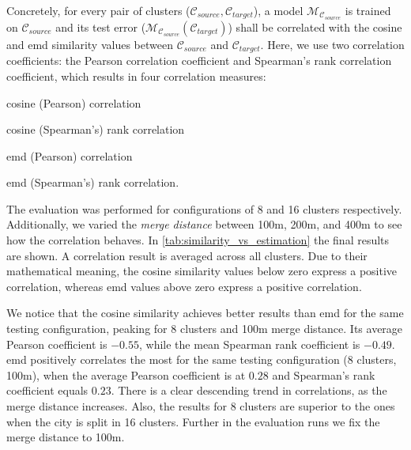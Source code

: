 	
	 
	Concretely, for every pair of clusters ($\mathcal{C}_{source}, \mathcal{C}_{target}$), a model $\mathcal{M}_{\mathcal{C}_{source}}$ is trained on $\mathcal{C}_{source}$ and its test error ($\mathcal{M}_{\mathcal{C}_{source}}(\mathcal{C}_{target})$) shall be correlated with the cosine and emd similarity values between $\mathcal{C}_{source}$ and $\mathcal{C}_{target}$. Here, we use two correlation coefficients: the Pearson correlation coefficient and Spearman's rank correlation coefficient, which results in four correlation measures: 
	\begin{romanlist}
		\item	cosine (Pearson) correlation
		\item 	cosine (Spearman's) rank correlation
		\item 	emd (Pearson) correlation
		\item 	emd (Spearman's) rank correlation. 
	\end{romanlist}
	The evaluation was performed for configurations of 8 and 16 clusters respectively. Additionally, we varied the \textit{merge distance} between 100m, 200m, and 400m to see how the correlation behaves. In \cref{tab:similarity_vs_estimation} the final results are shown. A correlation result is averaged across all clusters. Due to their mathematical meaning, the cosine similarity values below zero express a positive correlation, whereas emd values above zero express a positive correlation. 
	
	We notice that the cosine similarity achieves better results than emd for the same testing configuration, peaking for 8 clusters and 100m merge distance. Its average Pearson coefficient is $-0.55$, while the mean Spearman rank coefficient is $-0.49$. emd positively correlates the most for the same testing configuration (8 clusters, 100m), when the average Pearson coefficient is at $0.28$ and Spearman's rank coefficient equals $0.23$. There is a clear descending trend in correlations, as the merge distance increases.  Also, the results for 8 clusters are superior to the ones when the city is split in 16 clusters. Further in the evaluation runs we fix the merge distance to 100m.
	
